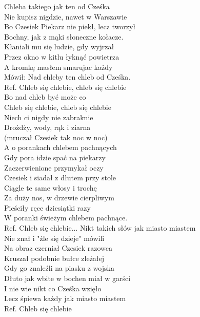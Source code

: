 \begin{flushleft}
Chleba takiego jak ten od Cześka \\
Nie kupisz nigdzie, nawet w Warszawie \\
Bo Czesiek Piekarz nie piekł, lecz tworzył \\
Bochny, jak z mąki słoneczne kołacze. \\
\hop
Kłaniali mu się ludzie, gdy wyjrzał \\
Przez okno w kitlu łyknąć powietrza \\
A kromkę masłem smarujac każdy \\
Mówił: Nad chleby ten chleb od Cześka. \\
\hops
Ref. Chleb się chlebie, chleb się chlebie \\
\hspace{0.9cm}Bo nad chleb być może co \\
\hspace{0.9cm}Chleb się chlebie, chleb się chlebie \\
\hspace{0.9cm}Niech ci nigdy nie zabraknie \\
\hspace{0.9cm}Drożdży, wody, rąk i ziarna \\
\hspace{0.9cm}(mruczał Czesiek tak noc w noc) \\
\hops
A o porankach chlebem pachnących\\
Gdy pora idzie spać na piekarzy\\
Zaczerwienione przymykał oczy\\
Czesiek i siadał z dłutem przy stole\\
\hop
Ciągle te same włosy i trochę\\
Za duży nos, w drzewie cierpliwym\\
Pieściły ręce dziesiątki razy\\
W poranki świeżym chlebem pachnące.\\
\hops
Ref. Chleb się chlebie...
\hops
Nikt takich słów jak miasto miastem\\
Nie znał i "źle się dzieje" mówili\\
Na obraz czerniał Czesiek razowca\\
Kruszał podobnie bułce zleżałej\\
\hop
Gdy go znaleźli na piasku z wojska\\
Dłuto jak wbite w bochen miał w garści\\
I  nie wie nikt co Cześka wzięło\\
Lecz śpiewa każdy jak miasto miastem\\
\hops
Ref. Chleb się chlebie
\end{flushleft}
\newpage